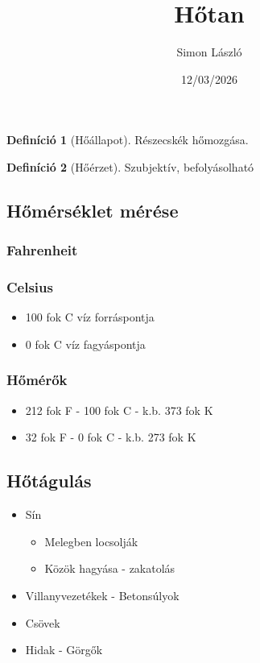 \documentclass{article}
\title{Hőtan}
\author{Simon László}
\date{12/03/2026}
\theoremstyle{definition}
\newtheorem{definition}{Definíció}[section]
\begin{document}
\maketitle
\section{}
\begin{definition}[Hőállapot]
    Részecskék hőmozgása.
\end{definition}

\begin{definition}[Hőérzet]
    Szubjektív, befolyásolható
\end{definition}

\subsection{Hőmérséklet mérése}

\subsubsection{Fahrenheit}
\subsubsection{Celsius}
\begin{itemize}
    \item 100 fok C víz forráspontja
    \item 0 fok C víz fagyáspontja
\end{itemize}

\subsubsection{Hőmérők}
\begin{itemize}
    \item 212 fok F - 100 fok C - k.b. 373 fok K
    \item 32 fok F - 0 fok C - k.b. 273 fok K
\end{itemize}

\subsection{Hőtágulás}

\begin{itemize}
    \item Sín \begin{itemize}
        \item Melegben locsolják
        \item Közök hagyása - zakatolás
    \end{itemize}
    \item Villanyvezetékek - Betonsúlyok
    \item Csövek %
    \item Hidak - Görgők %
\end{itemize}
\end{document}

